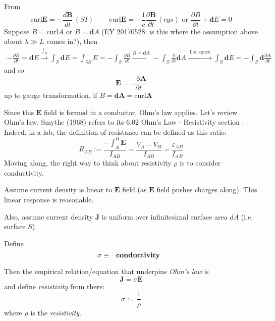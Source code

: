 \documentclass[10pt]{amsart}
\begin{document}
\begin{multicols*}{2}
From 
\[
\text{curl} \mathbf{E} = -\frac{d\mathbf{B}}{dt} \, (SI) \qquad \, \text{curl}\mathbf{E} = -\frac{1}{c} \frac{ \partial \mathbf{B}}{ \partial t} \, (cgs) \text{ or } \frac{ \partial B}{ \partial t} + \mathbf{d}E = 0 
\]
Suppose $B = \text{curl} A$ or $B=\mathbf{d}A$ (EY 20170528: is this where the assumption above about $\lambda \gg L$ comes in?), then
\[
\begin{gathered}
	-\frac{\partial B}{ \partial t} = \mathbf{d}E \xrightarrow{ \int_S } \int_S \mathbf{d}E = \int_{ \partial S} E = -\int_S \frac{ \partial B}{ \partial t} \xrightarrow{ B = \mathbf{d}A } -\int_S \frac{ \partial }{ \partial t} \mathbf{d}A \xrightarrow{ \text{ flat space } } \int_S \mathbf{d}E = -\int_S \mathbf{d} \frac{ \partial A}{ \partial t}	
\end{gathered}
\]
and so
\begin{equation}
	\mathbf{E} = \frac{-\partial \mathbf{A}}{ \partial t}
\end{equation}
up to gauge transformation, if $B = \mathbf{d}\mathbf{A} = \text{curl}\mathbf{A}$

Since this $\mathbf{E}$ field is formed in a conductor, Ohm's law applies.  Let's review Ohm's law.  Smythe (1968) refers to its 6.02 Ohm's Law - Resistivity section \cite{Smyt1968}.  Indeed, in a lab, the definition of resistance can be defined as this ratio:
\begin{equation}
R_{AB} := \frac{ -\int_A^B \mathbf{E} }{ I_{AB} } = \frac{ V_A- V_B}{ I_{AB} } = \frac{ \varepsilon_{AB} }{ I_{AB} }
\end{equation}
Moving along, the right way to think about resistivity $\rho$ is to consider conductivity.  

Assume current density is linear to $\mathbf{E}$ field (as $\mathbf{E}$ field pushes charges along).  This linear response is reasonable.  

Also, assume current density $\mathbf{J}$ is uniform over infinitesimal surface area $dA$ (i.e. surface $S$).  

Define 
\begin{equation}
\sigma \equiv \text{ \textbf{ conductivity } }
\end{equation}

Then the empirical relation/equation that underpins \emph{Ohm's law} is 
\begin{equation}
\mathbf{J} = \sigma \mathbf{E}
\end{equation}
and define \emph{resistivity} from there:
\begin{equation}
\sigma := \frac{1}{\rho}
\end{equation}
where $\rho $ is the \emph{resistivity}. 


\end{multicols*}
\end{document}
